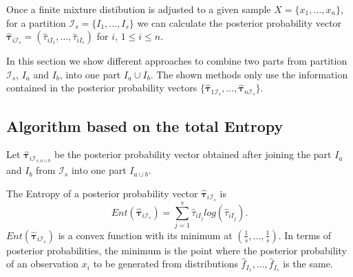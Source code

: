 \documentclass[10pt, a4paper]{article}
\newcommand{\m}[1]{\boldsymbol{#1}}
\begin{document}
Once a finite mixture distibution is adjusted to a given sample $X=\{x_1, \dots, x_n\}$, for a partition $\mathcal{I}_s = \{ I_1, \dots, I_s\}$ we can calculate the posterior probability vector   $\hat{\m\tau}_{i \mathcal{I}_s} = \left( \hat{\tau}_{i I_1} , \dots, \hat{\tau}_{i I_s}  \right)$ for $i$, $1 \leq i \leq n$.

In this section we show different approaches to combine two parts from partition $\mathcal{I}_s$, $I_a$ and $I_b$, into one part $I_a \cup I_b$. The shown methods only use the information contained in the posterior probability vectors $\{ \hat{\m\tau}_{1 \mathcal{I}_s},\dots, \hat{\m\tau}_{n \mathcal{I}_s} \}$.


\subsection*{Algorithm based on the total Entropy}



Let $\hat{\m \tau}_{i \mathcal{I}_{s, a \cup b}}$ be the posterior probability vector obtained  after joining the part $I_a$ and $I_b$ from $ \mathcal{I}_s$ into one part $I_{a \cup b}$. 

The Entropy of a posterior probability vector $\hat{\m \tau}_{i \mathcal{I}_s}$ is
\[
Ent( \hat{\m \tau}_{i \mathcal{I}_s} ) = \sum_{j=1}^s \hat{\tau}_{i I_j}  log(\hat{\tau}_{i I_j} ).
\]
$Ent( \hat{\m \tau}_{i \mathcal{I}_s} )$ is a convex function with its minimum at $(\frac{1}{s},\dots,\frac{1}{s})$. In terms of posterior probabilities, the minimum is the point where the posterior probability of an observation $x_i$ to be generated from distributions $\hat{f}_{I_1}, \dots, \hat{f}_{I_s}$ is the same.
\end{document}
